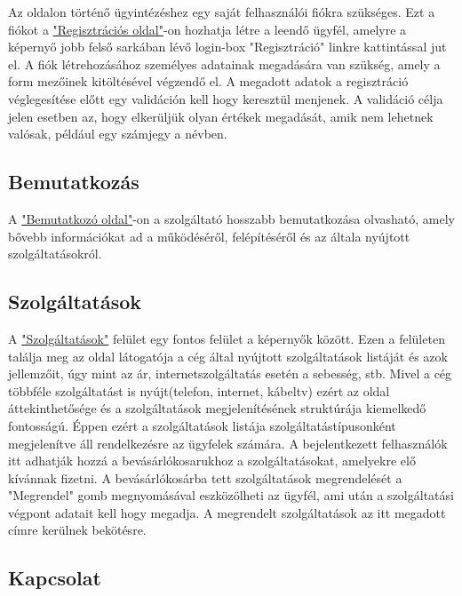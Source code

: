 \documentclass[centeredchapter]{thesis-ekf}
\theoremstyle{definition}
\theoremstyle{remark}
\begin{document}
Az oldalon történő ügyintézéshez egy saját felhasználói fiókra szükséges. Ezt a fiókot a \hyperlink{leiras-regisztracios}{"Regisztrációs oldal"}-on hozhatja létre a leendő ügyfél, amelyre a képernyő jobb felső sarkában lévő login-box "Regisztráció" linkre kattintással jut el. A fiók létrehozásához személyes adatainak megadására van szükség, amely a form mezőinek kitöltésével végzendő el. A megadott adatok a regisztráció véglegesítése előtt egy validáción kell hogy keresztül menjenek. A validáció célja jelen esetben az, hogy elkerüljük olyan értékek megadását, amik nem lehetnek valósak, például egy számjegy a névben. 

\subsection{Bemutatkozás}\hypertarget{leiras-bemutatkozo}{}

A \hyperlink{leiras-bemutatkozo}{"Bemutatkozó oldal"}-on a szolgáltató hosszabb bemutatkozása olvasható, amely bővebb információkat ad a működéséről, felépítéséről és az általa nyújtott szolgáltatásokról.

\subsection{Szolgáltatások}\hypertarget{leiras-szolgaltatasok}{}

A \hyperlink{leiras-szolgaltatasok}{"Szolgáltatások"} felület egy fontos felület a képernyők között. Ezen a felületen találja meg az oldal látogatója a cég által nyújtott szolgáltatások listáját és azok jellemzőit, úgy mint az ár, internetszolgáltatás esetén a sebesség, stb. Mivel a cég többféle szolgáltatást is nyújt(telefon, internet, kábeltv) ezért az oldal áttekinthetősége és a szolgáltatások megjelenítésének struktúrája kiemelkedő fontosságú. Éppen ezért a szolgáltatások listája szolgáltatástípusonként megjelenítve áll rendelkezésre az ügyfelek számára.
A bejelentkezett felhasználók itt adhatják hozzá a bevásárlókosarukhoz a szolgáltatásokat, amelyekre elő kívánnak fizetni. A bevásárlókosárba tett szolgáltatások megrendelését a "Megrendel" gomb megnyomásával eszközölheti az ügyfél, ami után a szolgáltatási végpont adatait kell hogy megadja. A megrendelt szolgáltatások az itt megadott címre kerülnek bekötésre.

\subsection{Kapcsolat}\hypertarget{leiras-kapcsolat}{}
\end{document}
